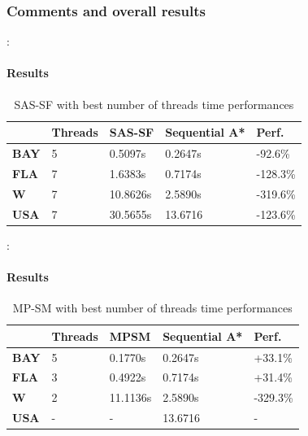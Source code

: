 \documentclass[12pt]{beamer}
\begin{document}
	\subsubsection{Comments and overall results}
	\begin{frame}{\secname : \subsecname}
		\framesubtitle{Results}
		\begin{table}[ht!]
			\centering
			\caption{SAS-SF with best number of threads time performances}
			\begin{tabular}{|l|l|l|l|l|}
			\hline
			\textbf{}    & \textbf{Threads} & \textbf{SAS-SF} & \textbf{Sequential A*} & \textbf{Perf.}\\ \hline
			\textbf{BAY} & 5        & 0.5097s                & 0.2647s  &-92.6\%          \\ \hline
			\textbf{FLA} & 7        & 1.6383s                & 0.7174s  &-128.3\%          \\ \hline
			\textbf{W}   & 7        & 10.8626s                & 2.5890s &-319.6\%           \\ \hline
			\textbf{USA} & 7         & 30.5655s               & 13.6716 &-123.6\%           \\ \hline
			\end{tabular}
			\label{tablesas}
		  \end{table}
	\end{frame}
	\begin{frame}{\secname : \subsecname}
		\framesubtitle{Results}
		\begin{table}[ht!]
			\centering
			\caption{MP-SM with best number of threads time performances}
			\begin{tabular}{|l|l|l|l|l|}
			\hline
			\textbf{}    & \textbf{Threads} & \textbf{MPSM} & \textbf{Sequential A*} & \textbf{Perf.}\\ \hline
			\textbf{BAY} & 5        & 0.1770s                & 0.2647s  &+33.1\%          \\ \hline
			\textbf{FLA} & 3        & 0.4922s                & 0.7174s  &+31.4\%          \\ \hline
			\textbf{W}   & 2        & 11.1136s                & 2.5890s &-329.3\%           \\ \hline
			\textbf{USA} & -         & -                      & 13.6716 &-           \\ \hline
			\end{tabular}
			\label{tablempsm}
		  \end{table}
	\end{frame}
\end{document}
